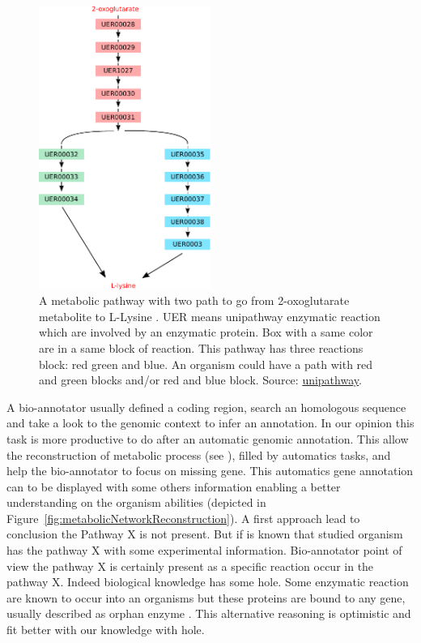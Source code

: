 \documentclass{llncs}
\begin{document}
\begin{figure}[H]
    \centering
    \includegraphics[width=0.5\textwidth]{img/unipathway.pdf}
    \caption{A metabolic pathway with two path to go from 2-oxoglutarate metabolite to L-Lysine . UER means unipathway enzymatic reaction which are involved by an enzymatic protein. Box with a same color are in a same block of reaction. This pathway has three reactions block: red green and blue. An organism could have a path with red and green blocks and/or red and blue block. Source: \href{http://www.grenoble.prabi.fr}{unipathway}.}
    \label{fig:pathway}
\end{figure}

A bio-annotator usually defined a coding region, search an homologous sequence and take a look to the genomic context to infer an annotation. In our opinion this task is more productive to do after an automatic genomic annotation. This allow the reconstruction of metabolic process (see \cite{francke2005reconstructing}), filled by automatics tasks, and help the bio-annotator to focus on missing gene. This automatics gene annotation can to be displayed with some others information
enabling a better understanding on the organism abilities (depicted in Figure~\ref{fig:metabolicNetworkReconstruction}). A first approach lead to conclusion the Pathway X is not present. But if is known that studied organism has the pathway X with some experimental information. Bio-annotator point of view the pathway X is certainly present as a specific reaction occur in the pathway X. Indeed biological knowledge has some hole. Some enzymatic reaction are known to occur into an  organisms but these proteins are bound to any gene, usually described as orphan enzyme \cite{sorokina2014profiling}. This alternative reasoning is optimistic and fit better with our knowledge with hole.
\end{document}

